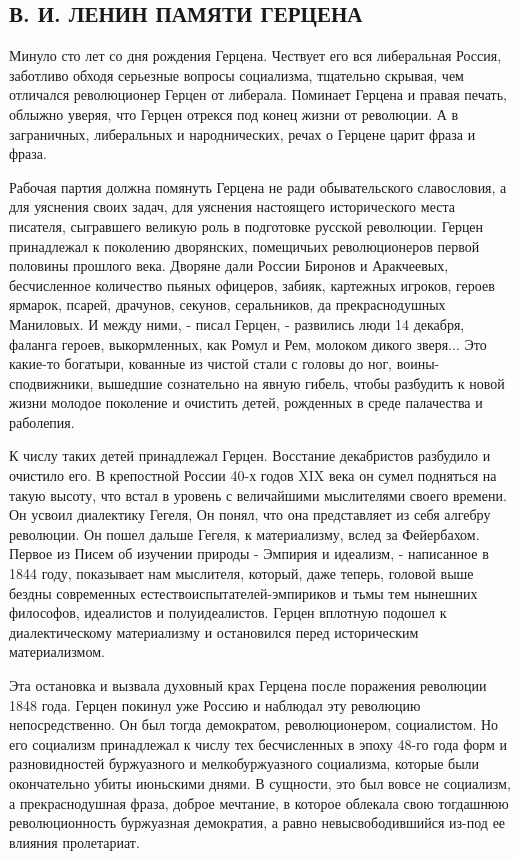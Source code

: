 \documentclass[12pt]{article}
\newcommand{\parnum}{(\arabic{parcount})}
\newcounter{parcount}
\newenvironment{parnumbers}{%
  \par%
  \everypar{\noindent \stepcounter{parcount}\marginpar[]{\parnum}}%
}{}
\begin{document}
\subsection{В. И. ЛЕНИН ПАМЯТИ ГЕРЦЕНА}
\begin{parnumbers}
Минуло сто лет со дня рождения Герцена. Чествует его вся либеральная Россия, заботливо обходя серьезные вопросы социализма, тщательно скрывая, чем отличался революционер Герцен от либерала. Поминает Герцена и правая печать, облыжно уверяя, что Герцен отрекся под конец жизни от революции. А в заграничных, либеральных и народнических, речах о Герцене царит фраза и фраза.

Рабочая партия должна помянуть Герцена не ради обывательского славословия, а для уяснения своих задач, для уяснения настоящего исторического места писателя, сыгравшего великую роль в подготовке русской революции. Герцен принадлежал к поколению дворянских, помещичьих революционеров первой половины прошлого века. Дворяне дали России Биронов и Аракчеевых, бесчисленное количество пьяных офицеров, забияк, картежных игроков, героев ярмарок, псарей, драчунов, секунов, серальников, да прекраснодушных Маниловых. И между ними, - писал Герцен, - развились люди 14 декабря, фаланга героев, выкормленных, как Ромул и Рем, молоком дикого зверя... Это какие-то богатыри, кованные из чистой стали с головы до ног, воины-сподвижники, вышедшие сознательно на явную гибель, чтобы разбудить к новой жизни молодое поколение и очистить детей, рожденных в среде палачества и раболепия.

К числу таких детей принадлежал Герцен. Восстание декабристов разбудило и очистило его. В крепостной России 40-х годов XIX века он сумел подняться на такую высоту, что встал в уровень с величайшими мыслителями своего времени. Он усвоил диалектику Гегеля, Он понял, что она представляет из себя алгебру революции. Он пошел дальше Гегеля, к материализму, вслед за Фейербахом. Первое из Писем об изучении природы - Эмпирия и идеализм, - написанное в 1844 году, показывает нам мыслителя, который, даже теперь, головой выше бездны современных естествоиспытателей-эмпириков и тьмы тем нынешних философов, идеалистов и полуидеалистов. Герцен вплотную подошел к диалектическому материализму и остановился перед историческим материализмом.

Эта остановка и вызвала духовный крах Герцена после поражения революции 1848 года. Герцен покинул уже Россию и наблюдал эту революцию непосредственно. Он был тогда демократом, революционером, социалистом. Но его социализм принадлежал к числу тех бесчисленных в эпоху 48-го года форм и разновидностей буржуазного и мелкобуржуазного социализма, которые были окончательно убиты июньскими днями. В сущности, это был вовсе не социализм, а прекраснодушная фраза, доброе мечтание, в которое облекала свою тогдашнюю революционность буржуазная демократия, а равно невысвободившийся из-под ее влияния пролетариат.


\end{parnumbers}
\end{document}
